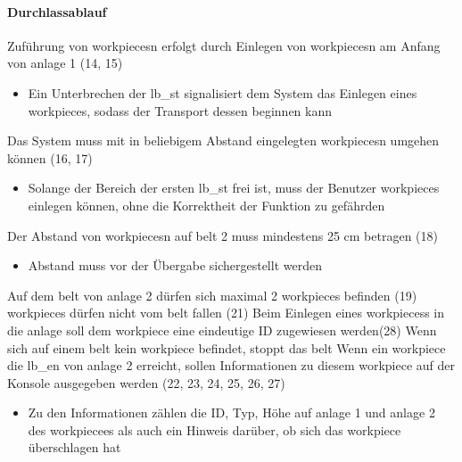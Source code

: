 \paragraph{Durchlassablauf}
\begin{itemize}
     Zuführung von \glspl{workpiece}n erfolgt durch Einlegen von \glspl{workpiece}n am Anfang von \gls{anlage} 1 (14, 15)
    \begin{itemize}
        \item Ein Unterbrechen der \gls{lb_st} signalisiert dem System das Einlegen eines \gls{workpiece}s,
        sodass der Transport dessen beginnen kann
    \end{itemize}
     Das System muss mit in beliebigem Abstand eingelegten \glspl{workpiece}n umgehen können (16, 17) %
    \begin{itemize}
        \item Solange der Bereich der ersten \gls{lb_st} frei ist, muss der Benutzer \glspl{workpiece}
        einlegen können, ohne die Korrektheit der Funktion zu gefährden
    \end{itemize}
     Der Abstand von \glspl{workpiece}n auf \gls{belt} 2 muss mindestens 25 cm betragen (18)
    \begin{itemize}
        \item Abstand muss vor der Übergabe sichergestellt werden
    \end{itemize}
     Auf dem \gls{belt} von \gls{anlage} 2 dürfen sich maximal 2 \glspl{workpiece} befinden (19)
     \Glspl{workpiece} dürfen nicht vom \gls{belt} fallen (21)
     Beim Einlegen eines \glspl{workpiece}s in die \gls{anlage} soll dem \gls{workpiece} eine eindeutige ID zugewiesen werden(28)
     Wenn sich auf einem \gls{belt} kein \gls{workpiece} befindet, stoppt das \gls{belt}
     Wenn ein \gls{workpiece} die \gls{lb_en} von \gls{anlage} 2 erreicht,
    sollen Informationen zu diesem \gls{workpiece} auf der Konsole ausgegeben werden (22, 23, 24, 25, 26, 27)
    \begin{itemize}
        \item Zu den Informationen zählen die ID, Typ, Höhe auf \gls{anlage} 1 und \gls{anlage} 2 des \gls{workpiece}es als
        auch ein Hinweis darüber, ob sich das \gls{workpiece} überschlagen hat
    \end{itemize}
\end{itemize}

